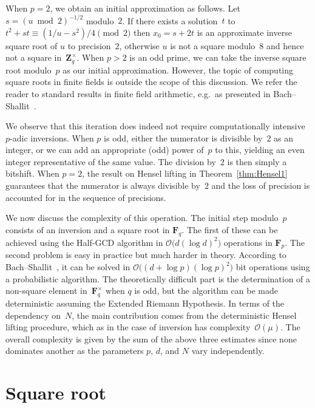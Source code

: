 When $p = 2$, we obtain an initial approximation as follows. 
Let \mbox{$s = (u \bmod 2)^{-1/2}$} modulo~$2$.  If there exists a solution~$t$ 
to $t^2 + s t \equiv (1/u - s^2) / 4 \pmod{2}$ then $x_0 = s + 2 t$ 
is an approximate inverse square root of $u$ to precision~$2$, 
otherwise $u$ is not a square modulo~$8$ and hence not a square 
in~$\mathbf{Z}_q^{\times}$.  When $p > 2$ is an odd prime, we can 
take the inverse square root modulo~$p$ as our initial approximation.
However, the topic of computing square roots in finite fields is outside 
the scope of this discussion.  We refer the reader to standard 
results in finite field arithmetic, e.g.\ as presented in 
Bach--Shallit~\mbox{\citep[\S 7]{Bac96}}.

We observe that this iteration does indeed not require computationally 
intensive $p$-adic inversions.  When $p$ is odd, either the numerator 
is divisible by~$2$ as an integer, or we can add an appropriate (odd) 
power of~$p$ to this, yielding an even integer representative of the 
same value.  The division by~$2$ is then simply a bitshift.  When $p = 2$, 
the result on Hensel lifting in Theorem~\ref{thm:Hensel1} guarantees that 
the numerator is always divisible by~$2$ and the loss of precision is 
accounted for in the sequence of precisions.

We now discuss the complexity of this operation.  The initial step 
modulo~$p$ consists of an inversion and a square root in $\mathbf{F}_q$. 
The first of these can be achieved using the Half-GCD algorithm 
in $\mathcal{O}\bigl(d (\log d)^2\bigr)$ operations in $\mathbf{F}_p$.  
The second problem is easy in practice but much harder in theory.  According 
to Bach--Shallit~\citep[\S 7, Exercise~34]{Bac96}, 
it can be solved in $\mathcal{O}\bigl((d + \log p) (\log p)^2\bigr)$ 
bit operations using a probabilistic algorithm.  The theoretically 
difficult part is the determination of a non-square element 
in~$\mathbf{F}_q^{\times}$ when $q$ is odd, but the algorithm can be 
made deterministic assuming the Extended Riemann Hypothesis.  In terms 
of the dependency on~$N$, the main contribution comes from the 
deterministic Hensel lifting procedure, which as in the case of 
inversion has complexity~$\mathcal{O}(\mu)$.  The overall complexity 
is given by the sum of the above three estimates since none dominates 
another as the parameters $p$, $d$, and $N$ vary independently.

\section{Square root}

